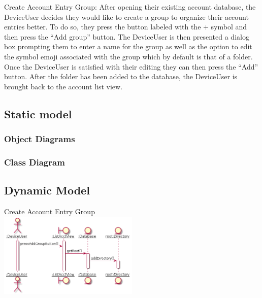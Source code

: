 \documentclass[stu]{apa7}
\begin{document}
{{Create Account Entry Group: After opening their existing account database, the DeviceUser decides they would like to create a group to organize their account entries better. To do so, they press the button labeled with the $+$ symbol and then press the ``Add group'' button. The DeviceUser is then presented a dialog box prompting them to enter a name for the group as well as the option to edit the symbol emoji associated with the group which by default is that of a folder. Once the DeviceUser is satisfied with their editing they can then press the ``Add''  button. After the folder has been added to the database, the DeviceUser is brought back to the account list view.

\subsection{Static model}

\subsubsection{Object Diagrams}

\subsubsection{Class Diagram}

\subsection{Dynamic Model}

Create Account Entry Group \\
\includegraphics[width=0.5\textwidth]{diag/gt/s1.png}

%
%
%
%

}}
\end{document}
